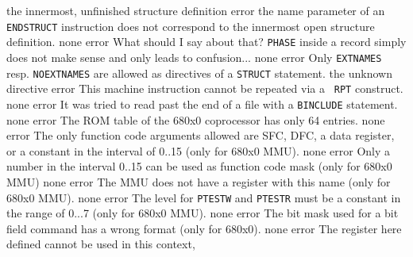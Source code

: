 \documentclass[12pt,twoside]{report}
\newcommand{\tty}[1]{{\tt #1}}
\begin{document}
\begin{description}
               {the innermost, unfinished structure definition}
               {error}
               {the name parameter of an \tty{ENDSTRUCT} instruction does
                not correspond to the innermost open structure
                definition.}
               {none}
               {error}
               {What should I say about that?  \tty{PHASE} inside a record
                simply does not make sense and only leads to
                confusion...}
               {none}
\errentry{1554}{invalid \tty{STRUCT} directive}
               {error}
               {Only \tty{EXTNAMES} resp. \tty{NOEXTNAMES} are allowed as
                directives of a \tty{STRUCT} statement.}
               {the unknown directive}
               {error}
               {This machine instruction cannot be repeated via a {\tt
                RPT} construct.}
               {none}
               {error}
               {It was tried to read past the end of a file with a 
                \tty{BINCLUDE} statement.}
               {none}
               {error}
               {The ROM table of the 680x0 coprocessor has only 64 entries.}
               {none}
               {error}
               {The only function code arguments allowed are SFC, DFC, a
                data register, or a constant in the interval of 0..15 (only
                for 680x0 MMU).}
               {none}
               {error}
               {Only a number in the interval 0..15 can be used as
                function code mask (only for 680x0 MMU)}
               {none}
               {error}
               {The MMU does not have a register with this name (only for
                680x0 MMU).}
               {none}
               {error}
               {The level for \tty{PTESTW} and \tty{PTESTR} must be a constant in the
                range of 0...7 (only for 680x0 MMU).}
               {none}
               {error}
               {The bit mask used for a bit field command has a wrong
                format (only for 680x0).}
               {none}
               {error}
               {The register here defined cannot be used in this context,
}
\end{description}
\end{document}
